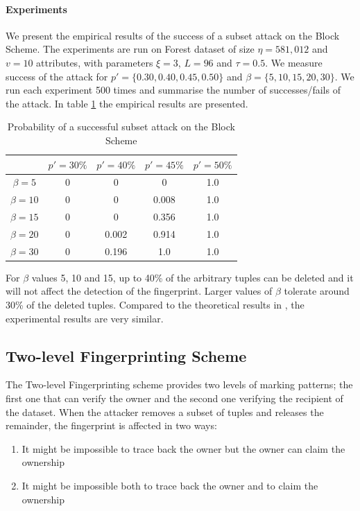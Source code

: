 \paragraph{Experiments}
We present the empirical results of the success of a subset attack on the Block Scheme. 
The experiments are run on Forest dataset of size $\eta = 581,012$ and $v=10$ attributes, with parameters $\xi=3$, $L=96$ and $\tau=0.5$.
We measure success of the attack for $p'=\{0.30, 0.40, 0.45, 0.50\}$ and $\beta=\{5,10,15,20,30\}$.
We run each experiment 500 times and summarise the number of successes/fails of the attack.
In table \ref{table:subset-attack-block-emp} the empirical results are presented.

\begin{table}[ht]
\caption{Probability of a successful subset attack on the Block Scheme}
\label{table:subset-attack-block-emp}
\centering
\begin{tabular}{|c|c|c|c|c|} 
 \hline
 & \textbf{$p'=30\%$} & \textbf{$p'=40\%$} & \textbf{$p'=45\%$} & \textbf{$p'=50\%$}\\
 \hline
 $\beta=5$ & 0 & 0 & 0 & 1.0 \\
 \hline
 $\beta=10$ & 0 & 0 & 0.008 & 1.0 \\
 \hline
 $\beta=15$ & 0 & 0 & 0.356 & 1.0 \\
 \hline
 $\beta=20$ & 0 & 0.002 & 0.914 & 1.0\\
 \hline
  $\beta=30$ & 0 & 0.196 & 1.0 & 1.0 \\
 \hline
\end{tabular}
\end{table}

For $\beta$ values 5, 10 and 15, up to 40\% of the arbitrary tuples can be deleted and it will not affect the detection of the fingerprint. 
Larger values of $\beta$ tolerate around 30\% of the deleted tuples. 
Compared to the theoretical results in , the experimental results are very similar.

\subsection{Two-level Fingerprinting Scheme}
The Two-level Fingerprinting scheme provides two levels of marking patterns; the first one that can verify the owner and the second one verifying the recipient of the dataset.
When the attacker removes a subset of tuples and releases the remainder, the fingerprint is affected in two ways:
\begin{enumerate}
    \item It might be impossible to trace back the owner but the owner can claim the ownership
    \item It might be impossible both to trace back the owner and to claim the ownership
\end{enumerate}

